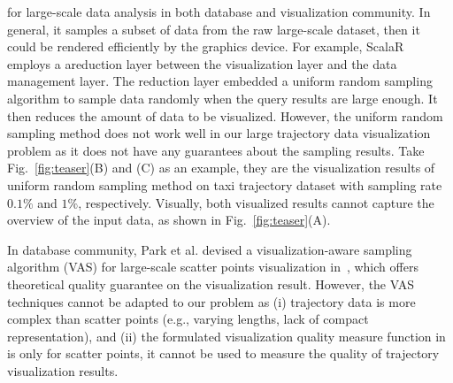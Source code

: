  for large-scale data analysis in both database and visualization community.
In general, it samples a subset of data from the raw large-scale dataset, then it could be rendered efficiently by the graphics device.
For example, ScalaR~\cite{battle2013dynamic} employs a areduction layer between the visualization layer and the data management layer.
The reduction layer embedded a uniform random sampling algorithm to sample data randomly when the query results are large enough.
It then reduces the amount of data to be visualized.
However, the uniform random sampling method does not work well in our large trajectory data visualization problem as it does not have any guarantees about the sampling results.
Take Fig.~\ref{fig:teaser}(B) and (C) as an example,
they are the visualization results of uniform random sampling method on \pt{} taxi trajectory dataset with sampling rate $0.1\%$ and $1\%$, respectively.
Visually, both visualized results cannot capture the overview of the input data, as shown in Fig.~\ref{fig:teaser}(A).

In database community,  Park et al. devised a visualization-aware sampling algorithm (VAS) for large-scale scatter points visualization  in~\cite{park2016visualization},
which offers theoretical quality guarantee on the visualization result.
However, the VAS techniques cannot be adapted to our problem as  (i) trajectory data is  more complex than scatter points (e.g., varying lengths, lack of compact representation),
and  (ii) the formulated visualization quality measure function in~\cite{park2016visualization} is only for scatter points, it cannot be used to measure the quality of trajectory visualization results.


